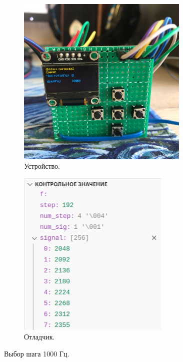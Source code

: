 	\begin{figure}[H]
     \begin{subfigure}[H]{0.5\textwidth}
         \centering
         \includegraphics[width=0.9\textwidth]{../image/test4_u_st.jpg}
         \caption{Устройство.}
     \end{subfigure}
     \hfill
     \begin{subfigure}[H]{0.5\textwidth}
         \centering
         \includegraphics[width=0.8\textwidth]{../image/test4_o_st.png}
         \caption{Отладчик.}
     \end{subfigure}
        \caption{Выбор шага 1000 Гц.}
	\end{figure}
	
